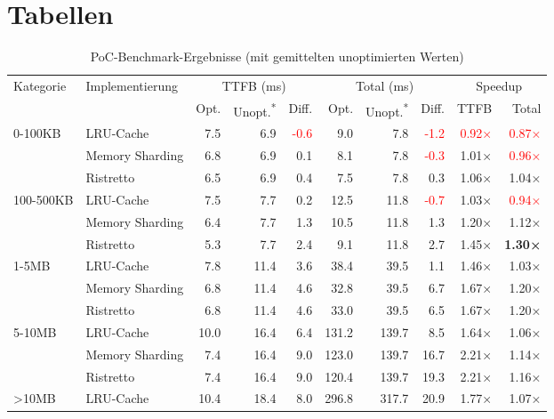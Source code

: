 \chapter*{Tabellen}
\begin{table}[htbp]
\centering
\caption{PoC-Benchmark-Ergebnisse (mit gemittelten unoptimierten Werten)}
\label{app-tab:cache-poc-averaged}
\begin{adjustbox}{width=\textwidth}
\begin{tabular}{@{}llrrrrrrrr@{}}
\toprule
\multirow{2}{*}{Kategorie} & \multirow{2}{*}{Implementierung} & \multicolumn{3}{c}{TTFB (ms)} & \multicolumn{3}{c}{Total (ms)} & \multicolumn{2}{c}{Speedup} \\
\cmidrule(lr){3-5} \cmidrule(lr){6-8} \cmidrule(lr){9-10}
 & & Opt. & Unopt.\textsuperscript{*} & Diff. & Opt. & Unopt.\textsuperscript{*} & Diff. & TTFB & Total \\
\midrule
 \multirow{3}{*}{0-100KB} & LRU-Cache & 7.5 & 6.9 & \textcolor{red}{-0.6} & 9.0 & 7.8 & \textcolor{red}{-1.2} & \textcolor{red}{0.92×} & \textcolor{red}{0.87×} \\
  & Memory Sharding & 6.8 & 6.9 & 0.1 & 8.1 & 7.8 & \textcolor{red}{-0.3} & 1.01× & \textcolor{red}{0.96×} \\
  & Ristretto & 6.5 & 6.9 & 0.4 & 7.5 & 7.8 & 0.3 & 1.06× & 1.04× \\
\midrule
 \multirow{3}{*}{100-500KB} & LRU-Cache & 7.5 & 7.7 & 0.2 & 12.5 & 11.8 & \textcolor{red}{-0.7} & 1.03× & \textcolor{red}{0.94×} \\
  & Memory Sharding & 6.4 & 7.7 & 1.3 & 10.5 & 11.8 & 1.3 & 1.20× & 1.12× \\
  & Ristretto & 5.3 & 7.7 & 2.4 & 9.1 & 11.8 & 2.7 & 1.45× & \textbf{1.30×} \\
\midrule
 \multirow{3}{*}{1-5MB} & LRU-Cache & 7.8 & 11.4 & 3.6 & 38.4 & 39.5 & 1.1 & 1.46× & 1.03× \\
  & Memory Sharding & 6.8 & 11.4 & 4.6 & 32.8 & 39.5 & 6.7 & 1.67× & 1.20× \\
  & Ristretto & 6.8 & 11.4 & 4.6 & 33.0 & 39.5 & 6.5 & 1.67× & 1.20× \\
\midrule
 \multirow{3}{*}{5-10MB} & LRU-Cache & 10.0 & 16.4 & 6.4 & 131.2 & 139.7 & 8.5 & 1.64× & 1.06× \\
  & Memory Sharding & 7.4 & 16.4 & 9.0 & 123.0 & 139.7 & 16.7 & 2.21× & 1.14× \\
  & Ristretto & 7.4 & 16.4 & 9.0 & 120.4 & 139.7 & 19.3 & 2.21× & 1.16× \\
\midrule
 \multirow{3}{*}{>10MB} & LRU-Cache & 10.4 & 18.4 & 8.0 & 296.8 & 317.7 & 20.9 & 1.77× & 1.07× \\

\end{tabular}
\end{adjustbox}
\end{table}

